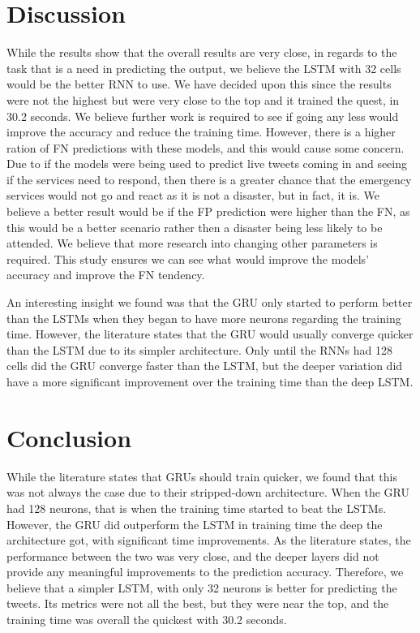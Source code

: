 \documentclass[a4paper,10pt]{article}
\begin{document}
\section{Discussion}
	While the results show that the overall results are very close, in regards to the task that is a need in predicting the output, we believe the LSTM with 32 cells would be the better RNN to use. We have decided upon this since the results were not the highest but were very close to the top and it trained the quest, in 30.2 seconds. We believe further work is required to see if going any less would improve the accuracy and reduce the training time. However, there is a higher ration of FN predictions with these models, and this would cause some concern. Due to if the models were being used to predict live tweets coming in and seeing if the services need to respond, then there is a greater chance that the emergency services would not go and react as it is not a disaster, but in fact, it is. We believe a better result would be if the FP prediction were higher than the FN, as this would be a better scenario rather then a disaster being less likely to be attended. We believe that more research into changing other parameters is required. This study ensures we can see what would improve the models' accuracy and improve the FN tendency.
	
	An interesting insight we found was that the GRU only started to perform better than the LSTMs when they began to have more neurons regarding the training time. However, the literature states that the GRU would usually converge quicker than the LSTM due to its simpler architecture. Only until the RNNs had 128 cells did the GRU converge faster than the LSTM, but the deeper variation did have a more significant improvement over the training time than the deep LSTM.
	
	

\section{Conclusion}
	While the literature states that GRUs should train quicker, we found that this was not always the case due to their stripped-down architecture. When the GRU had 128 neurons, that is when the training time started to beat the LSTMs. However, the GRU did outperform the LSTM in training time the deep the architecture got, with significant time improvements. As the literature states, the performance between the two was very close, and the deeper layers did not provide any meaningful improvements to the prediction accuracy. Therefore, we believe that a simpler LSTM, with only 32 neurons is better for predicting the tweets. Its metrics were not all the best, but they were near the top, and the training time was overall the quickest with 30.2 seconds.
	
\end{document}
